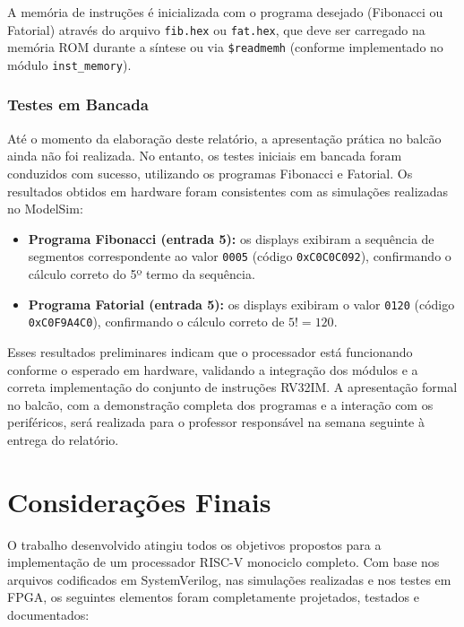 \documentclass[
	12pt,				%
	oneside,
	a4paper,			%
	english,			%
	french,				%
	spanish,			%
	brazil,				%
	]{abntex2}
\begin{document}
A memória de instruções é inicializada com o programa desejado (Fibonacci ou Fatorial) através do arquivo \texttt{fib.hex} ou \texttt{fat.hex}, que deve ser carregado na memória ROM durante a síntese ou via \texttt{\$readmemh} (conforme implementado no módulo \texttt{inst\_memory}).

\subsection{Testes em Bancada}

Até o momento da elaboração deste relatório, a apresentação prática no balcão ainda não foi realizada. No entanto, os testes iniciais em bancada foram conduzidos com sucesso, utilizando os programas Fibonacci e Fatorial. Os resultados obtidos em hardware foram consistentes com as simulações realizadas no ModelSim:

\begin{itemize}
  \item \textbf{Programa Fibonacci (entrada 5):} os displays exibiram a sequência de segmentos correspondente ao valor \texttt{0005} (código \texttt{0xC0C0C092}), confirmando o cálculo correto do 5º termo da sequência.
  \item \textbf{Programa Fatorial (entrada 5):} os displays exibiram o valor \texttt{0120} (código \texttt{0xC0F9A4C0}), confirmando o cálculo correto de $5! = 120$.
\end{itemize}

Esses resultados preliminares indicam que o processador está funcionando conforme o esperado em hardware, validando a integração dos módulos e a correta implementação do conjunto de instruções RV32IM. A apresentação formal no balcão, com a demonstração completa dos programas e a interação com os periféricos, será realizada para o professor responsável na semana seguinte à entrega do relatório.

\chapter{Considerações Finais}

O trabalho desenvolvido atingiu todos os objetivos propostos para a implementação de um processador RISC-V monociclo completo. Com base nos arquivos codificados em SystemVerilog, nas simulações realizadas e nos testes em FPGA, os seguintes elementos foram completamente projetados, testados e documentados:
\end{document}
